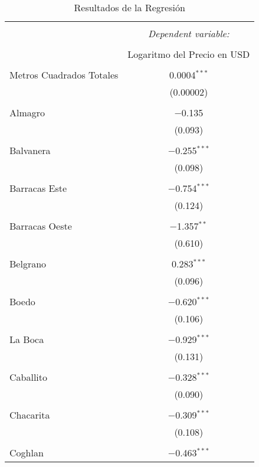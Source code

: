 
\begin{table}[!htbp] \centering 
  \caption{Resultados de la Regresión} 
  \label{tab:resultados_regresion} 
\begin{tabular}{@{\extracolsep{5pt}}lc} 
\\[-1.8ex]\hline 
\hline \\[-1.8ex] 
 & \multicolumn{1}{c}{\textit{Dependent variable:}} \\ 
\cline{2-2} 
\\[-1.8ex] & Logaritmo del Precio en USD \\ 
\hline \\[-1.8ex] 
 Metros Cuadrados Totales & 0.0004$^{***}$ \\ 
  & (0.00002) \\ 
  & \\ 
 Almagro & $-$0.135 \\ 
  & (0.093) \\ 
  & \\ 
 Balvanera & $-$0.255$^{***}$ \\ 
  & (0.098) \\ 
  & \\ 
 Barracas Este & $-$0.754$^{***}$ \\ 
  & (0.124) \\ 
  & \\ 
 Barracas Oeste & $-$1.357$^{**}$ \\ 
  & (0.610) \\ 
  & \\ 
 Belgrano & 0.283$^{***}$ \\ 
  & (0.096) \\ 
  & \\ 
 Boedo & $-$0.620$^{***}$ \\ 
  & (0.106) \\ 
  & \\ 
 La Boca & $-$0.929$^{***}$ \\ 
  & (0.131) \\ 
  & \\ 
 Caballito & $-$0.328$^{***}$ \\ 
  & (0.090) \\ 
  & \\ 
 Chacarita & $-$0.309$^{***}$ \\ 
  & (0.108) \\ 
  & \\ 
 Coghlan & $-$0.463$^{***}$ \\ 

\end{tabular}
\end{table}
